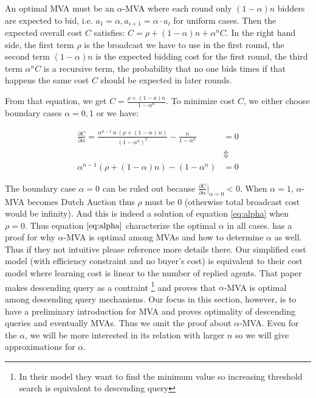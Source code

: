 An optimal MVA must be an $\alpha$-MVA where each round only $(1-\alpha) n$
bidders are expected to bid, i.e. $a_1 = \alpha, a_{i+1} = \alpha \cdot a_i$
for uniform cases. Then the expected overall cost $C$ satisfies: $ C = \rho +
(1-\alpha)n+\alpha^n C$. In the right hand side, the first term $\rho$ is the
broadcast we have to use in the first round, the second term $(1-\alpha)n$ is
the expected bidding cost for the first round, the third term $\alpha^n C$ is
a recursive term, the probability that no one bids times if that
happens the same cost $C$ should be expected in later rounds.  

From that equation, we get $C = \frac{
\rho+(1-a)n }{ 1-\alpha^n }$. To minimize cost $C$, we either choose boundary
cases $\alpha = 0, 1$ or we have: 

\begin{align}\label{eq:alpha}
\frac{\partial C}{\partial \alpha} = \frac{{\alpha}^{n-1}\,n\,\left(
\rho+\left( 1-\alpha\right) \,n\right) }{{\left( 1-{\alpha}^{n}\right)
}^{2}}-\frac{n}{1-{\alpha}^{n}} &= 0 \nonumber\\
&\Updownarrow\nonumber\\
\alpha^{n-1} (\rho + (1-\alpha)n) - (1-\alpha^n) &= 0
\end{align}

The boundary case $\alpha = 0$ can be ruled out because $\frac{\partial
C}{\partial \alpha} |_{\alpha = 0} < 0$.
When $\alpha = 1$, $\alpha$-MVA becomes Dutch Auction thus $\rho$ must be $0$
(otherwise total broadcast cost would be infinity). And this is indeed a
solution of equation \ref{eq:alpha} when $\rho = 0$. Thus equation
$\ref{eq:alpha}$ characterize the optimal $\alpha$ in all cases.
\cite{SarneSR2010:IncreasingSearch} has a proof for why $\alpha$-MVA is optimal
among MVAs and how to determine $\alpha$ as well. Thus if they not
intuitive please reference more details there.  Our simplified cost model
(with efficiency constraint and no buyer's cost) is equivalent to their cost
model where learning cost is linear to the number of replied agents.  That
paper makes descending query as a contraint \footnote{In their model they want
to find the minimum value so increasing threshold search is equivalent to
descending query} and proves that $\alpha$-MVA is optimal among descending
query mechanisms. Our focus in this section, however, is to have a preliminary
introduction for MVA and proves optimality of descending queries and eventually
MVAs. Thus we omit the proof about $\alpha$-MVA. Even for the $\alpha$, we will
be more interested in its relation with larger $n$ so we will give
approximations for $\alpha$.

